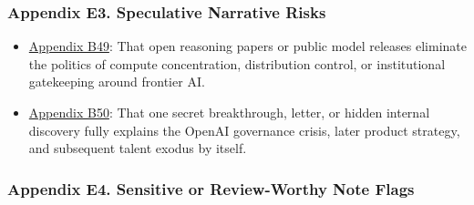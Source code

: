 \documentclass[
  american,
  11pt,
  letterpaper,
]{article}
\providecommand{\tightlist}{%
  \setlength{\itemsep}{0pt}\setlength{\parskip}{0pt}}
\begin{document}
\subsubsection{Appendix E3. Speculative Narrative
Risks}\label{appendix-e3-speculative-narrative-risks}

\begin{itemize}
\tightlist
\item
  \hyperref[appendix-b49-open-reasoning-papers-or-public-model-releases-eliminate-the-politics-of-compute]{Appendix
  B49}: That open reasoning papers or public model releases eliminate
  the politics of compute concentration, distribution control, or
  institutional gatekeeping around frontier AI.
\item
  \hyperref[appendix-b50-one-secret-breakthrough-letter-or-hidden-internal-discovery-fully-explains-the]{Appendix
  B50}: That one secret breakthrough, letter, or hidden internal
  discovery fully explains the OpenAI governance crisis, later product
  strategy, and subsequent talent exodus by itself.
\end{itemize}

\subsubsection{Appendix E4. Sensitive or Review-Worthy Note
Flags}\label{appendix-e4-sensitive-or-review-worthy-note-flags}
\end{document}
